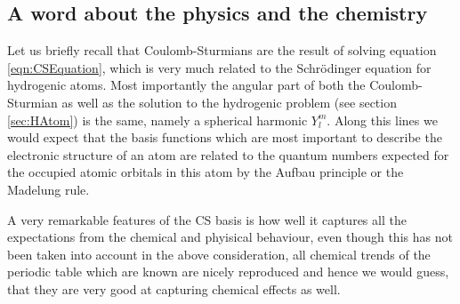 \subsection{A word about the physics and the chemistry}
Let us briefly recall that Coulomb-Sturmians are the result of
solving equation \eqref{eqn:CSEquation},
which is very much related to the Schrödinger equation for hydrogenic atoms.
Most importantly the angular part of both the Coulomb-Sturmian
as well as the solution to the hydrogenic problem (see section \vref{sec:HAtom})
is the same, namely a spherical harmonic $Y_l^m$.
Along this lines we would expect that the \CS basis functions
which are most important to describe the electronic structure
of an atom are related to the quantum numbers expected
for the occupied atomic orbitals in this atom by the Aufbau principle
or the Madelung rule.



A very remarkable features of the CS basis is how well it captures all the expectations
from the chemical and phyisical behaviour, even though this has not been taken
into account in the above consideration, all chemical trends of the
periodic table which are known are nicely reproduced and hence
we would guess, that they are very good at capturing chemical effects as well.

